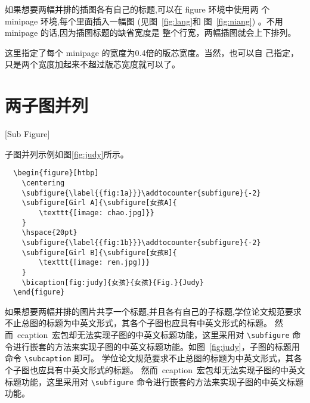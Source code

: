 如果想要两幅并排的插图各有自己的标题,可以在 figure 环境中使用两
个 minipage 环境,每个里面插入一幅图 (见图~\ref{fig:lang}和
图~\ref{fig:niang}) 。不用 minipage 的话,因为插图标题的缺省宽度是
整个行宽，两幅插图就会上下排列。

这里指定了每个 minipage 的宽度为0.4倍的版芯宽度。当然，也可以自
己指定，只是两个宽度加起来不超过版芯宽度就可以了。

\section{两子图并列}[Sub Figure]

子图并列示例如图\ref{fig:judy}所示。

\begin{figure}[htbp]
    \centering
    \addtocounter{subfigure}{-2}
    \hspace{20pt}
    \addtocounter{subfigure}{-2}
\end{figure}

\begin{lstlisting}
  \begin{figure}[htbp]
    \centering
    \subfigure{\label{{fig:1a}}}\addtocounter{subfigure}{-2}
    \subfigure[Girl A]{\subfigure[女孩A]{
        \texttt{[image: chao.jpg]}}
    }
    \hspace{20pt}
    \subfigure{\label{{fig:1b}}}\addtocounter{subfigure}{-2}
    \subfigure[Girl B]{\subfigure[女孩B]{
        \texttt{[image: ren.jpg]}}
    }
    \bicaption[fig:judy]{女孩}{女孩}{Fig.}{Judy}
  \end{figure}
\end{lstlisting}


如果想要两幅并排的图片共享一个标题,并且各有自己的子标题,学位论文规范要求不止总图的标题为中英文形式，其各个子图也应具有中英文形式的标题。
然而~ccaption~宏包却无法实现子图的中英文标题功能，这里采用对 \verb|\subfigure| 命令进行嵌套的方法来实现子图的中英文标题功能。如图~\ref{fig:judy}，子图的标题用命令 \verb|\subcaption| 即可。
学位论文规范要求不止总图的标题为中英文形式，其各个子图也应具有中英文形式的标题。
然而~ccaption~宏包却无法实现子图的中英文标题功能，这里采用对 \verb|\subfigure| 命令进行嵌套的方法来实现子图的中英文标题功能。


